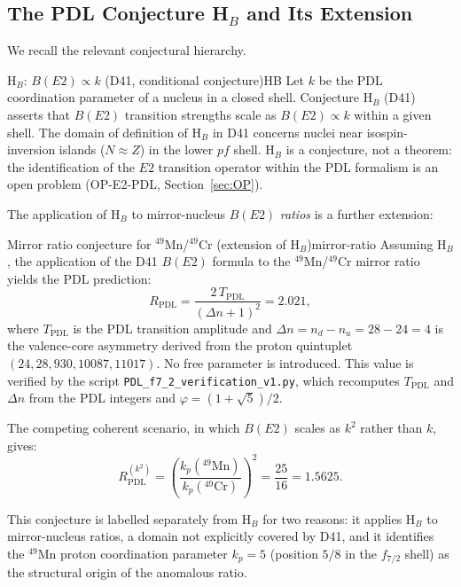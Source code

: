 \documentclass[12pt,a4paper]{article}
\theoremstyle{remark}
\begin{document}
\subsection{The PDL Conjecture H\texorpdfstring{$_B$}{B} and Its Extension}
\label{ssec:HB}

We recall the relevant conjectural hierarchy.

\begin{pdlconjecture}{H$_B$: $B(E2) \propto k$ (D41, conditional conjecture)}{HB}
Let $k$ be the PDL coordination parameter of a nucleus in a closed shell. Conjecture H$_B$ (D41) asserts that $B(E2)$ transition strengths scale as $B(E2) \propto k$ within a given shell. The domain of definition of H$_B$ in D41 concerns nuclei near isospin-inversion islands ($N \approx Z$) in the lower $pf$ shell. H$_B$ is a conjecture, not a theorem: the identification of the $E2$ transition operator within the PDL formalism is an open problem (OP-E2-PDL, Section~\ref{sec:OP}).
\end{pdlconjecture}

The application of H$_B$ to mirror-nucleus $B(E2)$ \emph{ratios} is a further extension:

\begin{pdlconjecture}{Mirror ratio conjecture for $^{49}$Mn/$^{49}$Cr (extension of H$_B$)}{mirror-ratio}
Assuming H$_B$, the application of the D41 $B(E2)$ formula to the $^{49}$Mn/$^{49}$Cr mirror ratio yields the PDL prediction:
\begin{equation}
\label{eq:RPDL}
R_{\text{PDL}} = \frac{2\,T_{\text{PDL}}}{(\Delta n + 1)^2} = 2.021,
\end{equation}
where $T_{\text{PDL}}$ is the PDL transition amplitude and $\Delta n = n_d - n_u = 28 - 24 = 4$ is the valence-core asymmetry derived from the proton quintuplet $(24, 28, 930, 10087, 11017)$. No free parameter is introduced. This value is verified by the script \texttt{PDL\_f7\_2\_verification\_v1.py}, which recomputes $T_{\text{PDL}}$ and $\Delta n$ from the PDL integers and $\varphi = (1+\sqrt{5})/2$.

The competing coherent scenario, in which $B(E2)$ scales as $k^2$ rather than $k$, gives:
\begin{equation}
R_{\text{PDL}}^{(k^2)} = \left(\frac{k_p(^{49}\text{Mn})}{k_p(^{49}\text{Cr})}\right)^2 = \frac{25}{16} = 1.5625.
\end{equation}

This conjecture is labelled separately from H$_B$ for two reasons: it applies H$_B$ to mirror-nucleus ratios, a domain not explicitly covered by D41, and it identifies the $^{49}$Mn proton coordination parameter $k_p = 5$ (position $5/8$ in the $f_{7/2}$ shell) as the structural origin of the anomalous ratio.
\end{pdlconjecture}
\end{document}
